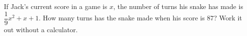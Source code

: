 If Jack's current score in a game is $x$, the number of turns his snake has made is $\dfrac19x^2+x+1$. How many turns has the snake made when his score is $87$? Work it out without a calculator.
